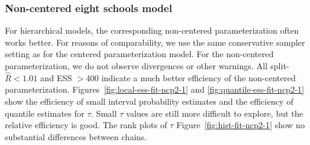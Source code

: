 \documentclass[american,]{article}
\begin{document}
\hypertarget{non-centered-eight-schools-model}{%
\subsubsection*{Non-centered eight schools
model}\label{non-centered-eight-schools-model}}

For hierarchical models, the corresponding non-centered
parameterization often works better. For reasons of comparability, we use the same conservative sampler setting as for the centered parameterization model. 
For the non-centered parameterization, we do not observe divergences or 
other warnings.
All split-\(\widehat{R}<1.01\) and ESS \(>400\) indicate a much
better efficiency of the non-centered parameterization.
Figures~\ref{fig:local-ess-fit-ncp2-1} and
\ref{fig:quantile-ess-fit-ncp2-1} show the efficiency of small interval
probability estimates and the efficiency of quantile estimates for
$\tau$.
Small $\tau$ values are still more difficult to explore, but the relative 
efficiency is good. The rank plots of $\tau$ Figure~\ref{fig:hist-fit-ncp2-1} 
show no substantial differences between chains.
\end{document}
